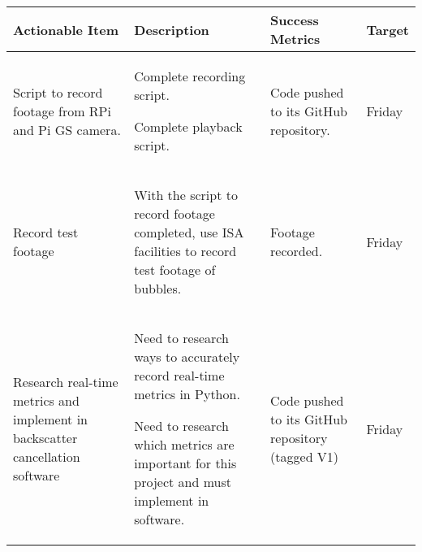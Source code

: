 \begin{table}[!h]
    \centering
    \begin{tabularx}{\textwidth}{|X|X|X|l|}
        \hline
        Actionable Item & Description & Success Metrics & Target \\
        \hline
        \hline
        Script to record footage from RPi and Pi GS camera. &
        \begin{myitemize}
            \item Complete recording script.
            \item Complete playback script.
        \end{myitemize} &
        \begin{myitemize}
            \item Code pushed to its GitHub repository.
        \end{myitemize} &
        Friday \\
        \hline
        Record test footage &
        \begin{myitemize}
            \item With the script to record footage completed, use ISA facilities to record test footage of bubbles.
        \end{myitemize} &
        \begin{myitemize}
            \item Footage recorded.
        \end{myitemize} &
        Friday \\
        \hline
        Research real-time metrics and implement in backscatter cancellation software &
        \begin{myitemize}
            \item Need to research ways to accurately record real-time metrics in Python.
            \item Need to research which metrics are important for this project and must implement in software.
        \end{myitemize} &
        \begin{myitemize}
            \item Code pushed to its GitHub repository (tagged V1)
        \end{myitemize} &
        Friday \\
        \hline
    \end{tabularx}
\end{table}
